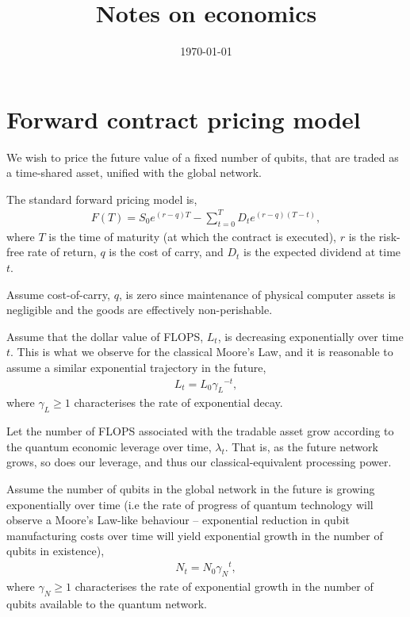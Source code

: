 \documentclass[aps,pra,twocolumn,amsmath,amssymb,nofootinbib,superscriptaddress]{revtex4}
\begin{document}


%
%

\title{Notes on economics}

%
%

\date{\today}

\frenchspacing

%
%

\begin{abstract}
\end{abstract}

\maketitle

\section{Forward contract pricing model}

We wish to price the future value of a fixed number of qubits, that are traded as a time-shared asset, unified with the global network.

The standard forward pricing model is,
\begin{align}
F(T) = S_0 e^{(r-q)T} - \sum_{t=0}^T D_t e^{(r-q)(T-t)},
\end{align}
where $T$ is the time of maturity (at which the contract is executed), $r$ is the risk-free rate of return, $q$ is the cost of carry, and $D_t$ is the expected dividend at time $t$.

Assume cost-of-carry, $q$, is zero since maintenance of physical computer assets is negligible and the goods are effectively non-perishable.

Assume that the dollar value of FLOPS, $L_t$, is decreasing exponentially over time $t$. This is what we observe for the classical Moore's Law, and it is reasonable to assume a similar exponential trajectory in the future,
\begin{align}
	L_t = L_0{\gamma_L}^{-t},
\end{align}
where \mbox{$\gamma_L\geq 1$} characterises the rate of exponential decay.

Let the number of FLOPS associated with the tradable asset grow according to the quantum economic leverage over time, $\lambda_t$. That is, as the future network grows, so does our leverage, and thus our classical-equivalent processing power.

Assume the number of qubits in the global network in the future is growing exponentially over time (i.e the rate of progress of quantum technology will observe a Moore's Law-like behaviour -- exponential reduction in qubit manufacturing costs over time will yield exponential growth in the number of qubits in existence),
\begin{align}
	N_t = N_0 {\gamma_N}^{t},
\end{align}
where \mbox{$\gamma_N\geq 1$} characterises the rate of exponential growth in the number of qubits available to the quantum network.
\end{document}
